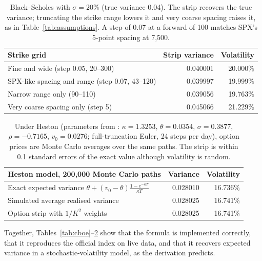 \documentclass[12pt]{article}
\begin{document}
\begin{table}[H]
\centering
\small
\begin{tabular}{@{}lrr@{}}
\toprule
\textbf{Strike grid} & \textbf{Strip variance} & \textbf{Volatility}\\
\midrule
Fine and wide (step 0.05, 20--300) & 0.040001 & 20.000\%\\
SPX-like spacing and range (step 0.07, 43--120) & 0.039997 & 19.999\%\\
Narrow range only (90--110) & 0.039056 & 19.763\%\\
Very coarse spacing only (step 5) & 0.045066 & 21.229\%\\
\bottomrule
\end{tabular}
\caption{Black--Scholes with $\sigma=20\%$ (true variance 0.04). The strip recovers the true variance; truncating the strike range lowers it and very coarse spacing raises it, as in Table~\ref{tab:assumptions}. A step of 0.07 at a forward of 100 matches SPX's 5-point spacing at 7,500.}
\label{tab:bs}
\end{table}

\begin{table}[H]
\centering
\small
\begin{tabular}{@{}lrr@{}}
\toprule
\textbf{Heston model, 200{,}000 Monte Carlo paths} & \textbf{Variance} & \textbf{Volatility}\\
\midrule
Exact expected variance $\theta+(v_0-\theta)\frac{1-e^{-\kappa T}}{\kappa T}$ & 0.028010 & 16.736\%\\
Simulated average realised variance & 0.028025 & 16.741\%\\
Option strip with $1/K^2$ weights & 0.028025 & 16.741\%\\
\bottomrule
\end{tabular}
\caption{Under Heston (parameters from \cite{gatheral}: $\kappa=1.3253$, $\theta=0.0354$, $\sigma=0.3877$, $\rho=-0.7165$, $v_0=0.0276$; full-truncation Euler, 24 steps per day), option prices are Monte Carlo averages over the same paths. The strip is within 0.1 standard errors of the exact value although volatility is random.}
\label{tab:heston}
\end{table}

Together, Tables~\ref{tab:cboe}--\ref{tab:heston} show that the formula is implemented correctly, that it reproduces the official index on live data, and that it recovers expected variance in a stochastic-volatility model, as the derivation predicts.

\appendix
\end{document}
